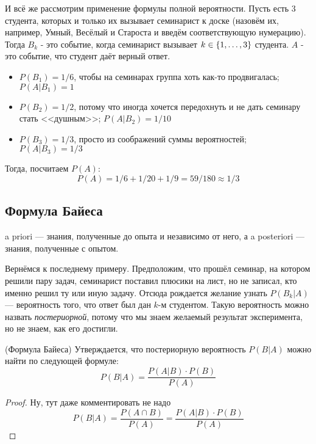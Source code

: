 \begin{example}
	И всё же рассмотрим применение формулы полной вероятности. Пусть есть 3 студента, которых и только их вызывает семинарист к доске (назовём их, например, Умный, Весёлый и Староста и введём соответствующую нумерацию). Тогда $B_k$ - это событие, когда семинарист вызывает $k \in \{1, \ldots, 3\}$ студента. $A$ - это событие, что студент даёт верный ответ.
	\begin{itemize}
		\item $P(B_1) = 1/6$, чтобы на семинарах группа хоть как-то продвигалась; $P(A | B_1) = 1$
		
		\item $P(B_2) = 1/2$, потому что иногда хочется передохнуть и не дать семинару стать <<душным>>; $P(A | B_2) = 1 / 10$
		
		\item $P(B_3) = 1/3$, просто из соображений суммы вероятностей; $P(A | B_3) = 1 / 3$
	\end{itemize}
	Тогда, посчитаем $P(A)$:
	\[
		P(A) = 1 / 6 + 1 / 20 + 1 / 9 = 59 / 180 \approx 1 / 3
	\]
\end{example}

\subsection{Формула Байеса}

\begin{note}
	a priori --- знания, полученные до опыта и независимо от него, а a posteriori --- знания, полученные с опытом.
\end{note}

\begin{example}
	Вернёмся к последнему примеру. Предположим, что прошёл семинар, на котором решили пару задач, семинарист поставил плюсики на лист, но не записал, кто именно решил ту или иную задачу. Отсюда рождается желание узнать $P(B_k | A)$ --- вероятность того, что ответ был дан $k$-м студентом. Такую вероятность можно назвать \textit{постериорной}, потому что мы знаем желаемый результат эксперимента, но не знаем, как его достигли.
\end{example}

\begin{theorem} (Формула Байеса)
	Утверждается, что постериорную вероятность $P(B | A)$ можно найти по следующей формуле:
	\[
		P(B | A) = \frac{P(A | B) \cdot P(B)}{P(A)}
	\]
\end{theorem}

\begin{proof}
	Ну, тут даже комментировать не надо
	\[
		P(B | A) = \frac{P(A \cap B)}{P(A)} = \frac{P(A | B) \cdot P(B)}{P(A)}
	\]
\end{proof}

